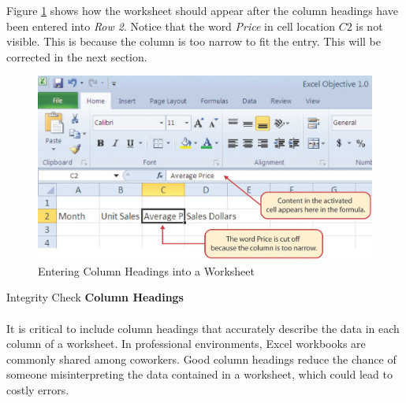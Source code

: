 Figure \ref{01:fig15} shows how the worksheet should appear after the column headings have been entered into \textit{Row 2}. Notice that the word \textit{Price} in cell location $ C2 $ is not visible. This is because the column is too narrow to fit the entry. This will be corrected in the next section.

\begin{figure}[H]
	\centering
	\includegraphics[width=\maxwidth{.95\linewidth}]{gfx/ch01_fig15}
	\caption{Entering Column Headings into a Worksheet}
	\label{01:fig15}
\end{figure}

\begin{center}
	\begin{infobox}{Integrity Check}
		\textbf{Column Headings}
		\\
		\\
		It is critical to include column headings that accurately describe the data in each column of a worksheet. In professional environments, Excel workbooks are commonly shared among coworkers. Good column headings reduce the chance of someone misinterpreting the data contained in a worksheet, which could lead to costly errors.
	\end{infobox}
\end{center}

